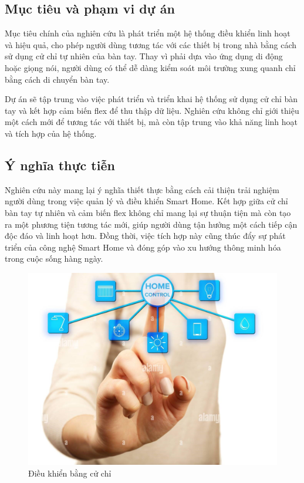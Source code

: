 \subsection{Mục tiêu và phạm vi dự án}

\indent Mục tiêu chính của nghiên cứu là phát triển một hệ thống điều khiển linh hoạt và hiệu quả, cho phép người dùng tương tác với các thiết bị trong nhà bằng cách sử dụng cử chỉ tự nhiên của bàn tay. Thay vì phải dựa vào ứng dụng di động hoặc giọng nói, người dùng có thể dễ dàng kiểm soát môi trường xung quanh chỉ bằng cách di chuyển bàn tay.

\indent Dự án sẽ tập trung vào việc phát triển và triển khai hệ thống sử dụng cử chỉ bàn tay và kết hợp cảm biến flex để thu thập dữ liệu. Nghiên cứu không chỉ giới thiệu một cách mới để tương tác với thiết bị, mà còn tập trung vào khả năng linh hoạt và tích hợp của hệ thống.

\subsection{Ý nghĩa thực tiễn}

\indent Nghiên cứu này mang lại ý nghĩa thiết thực bằng cách cải thiện trải nghiệm người dùng trong việc quản lý và điều khiển Smart Home. Kết hợp giữa cử chỉ bàn tay tự nhiên và cảm biến flex không chỉ mang lại sự thuận tiện mà còn tạo ra một phương tiện tương tác mới, giúp người dùng tận hưởng một cách tiếp cận độc đáo và linh hoạt hơn. Đồng thời, việc tích hợp này cũng thúc đẩy sự phát triển của công nghệ Smart Home và đóng góp vào xu hướng thông minh hóa trong cuộc sống hàng ngày.

\begin{figure}[H]
    \centering
    \includegraphics[width=12cm]{Images/Description/smarthome control.jpg}
\caption{Điều khiển bằng cử chỉ}
\end{figure}




